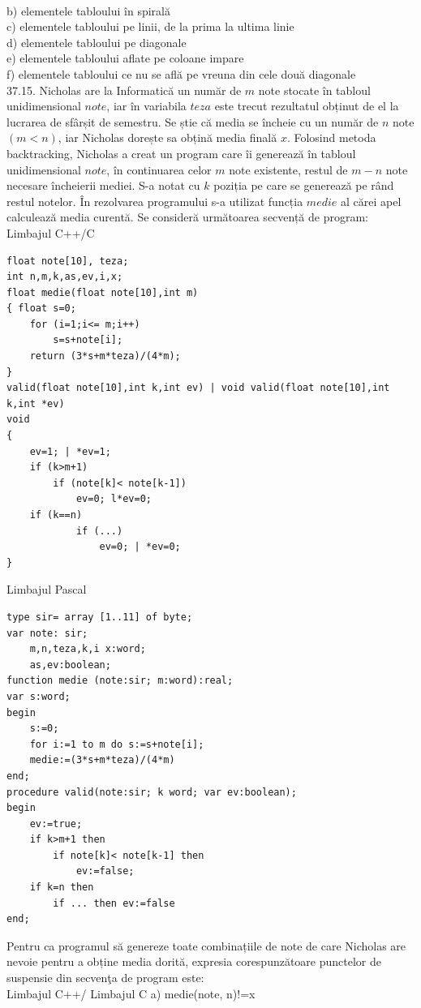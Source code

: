\begin{itemize}
\begin{enumerate}
\\
b) elementele tabloului în spirală
\\
c) elementele tabloului pe linii, de la prima la ultima linie
\\
d) elementele tabloului pe diagonale
\\
e) elementele tabloului aflate pe coloane impare
\\
f) elementele tabloului ce nu se află pe vreuna din cele două diagonale
\\
37.15. Nicholas are la Informatică un număr de $m$ note stocate în tabloul unidimensional $note$, iar în variabila $teza$ este trecut rezultatul obținut de el la lucrarea de sfârșit de semestru. Se știe că media se încheie cu un număr de $n$ note $(m<n)$, iar Nicholas dorește sa obțină media finală $x$.
Folosind metoda backtracking, Nicholas a creat un program care îi generează în tabloul unidimensional $note$, în continuarea celor $m$ note existente, restul de $m-n$ note necesare încheierii mediei. S-a notat cu $k$ poziția pe care se generează pe rând restul notelor.
În rezolvarea programului s-a utilizat funcția $medie$ al cărei apel calculează media curentă. Se consideră următoarea secvență de program:
Limbajul C++/C
\begin{verbatim}
float note[10], teza;
int n,m,k,as,ev,i,x;
float medie(float note[10],int m)
{ float s=0;
    for (i=1;i<= m;i++)
        s=s+note[i];
    return (3*s+m*teza)/(4*m);
}
valid(float note[10],int k,int ev) | void valid(float note[10],int k,int *ev)
void
{
    ev=1; | *ev=1;
    if (k>m+1)
        if (note[k]< note[k-1])
            ev=0; l*ev=0;
    if (k==n)
            if (...)
                ev=0; | *ev=0;
}
\end{verbatim}
Limbajul Pascal
\begin{verbatim}
type sir= array [1..11] of byte;
var note: sir;
    m,n,teza,k,i x:word;
    as,ev:boolean;
function medie (note:sir; m:word):real;
var s:word;
begin
    s:=0;
    for i:=1 to m do s:=s+note[i];
    medie:=(3*s+m*teza)/(4*m)
end;
procedure valid(note:sir; k word; var ev:boolean);
begin
    ev:=true;
    if k>m+1 then
        if note[k]< note[k-1] then
            ev:=false;
    if k=n then
        if ... then ev:=false
end;
\end{verbatim}
Pentru ca programul să genereze toate combinațiile de note de care Nicholas are nevoie pentru a obține media dorită, expresia corespunzătoare punctelor de suspensie din secvenţa de program este:
\\
Limbajul C++/ Limbajul C
a) medie(note, n)!=x

\end{enumerate}
\end{itemize}
